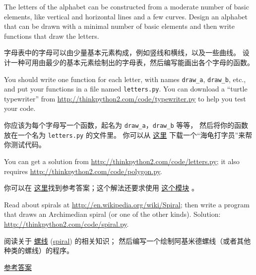\begin{exercise}
    

The letters of the alphabet can be constructed from a moderate number
of basic elements, like vertical and horizontal lines and a few
curves.  Design an alphabet that can be drawn with a minimal
number of basic elements and then write functions that draw the letters.

字母表中的字母可以由少量基本元素构成，例如竖线和横线，以及一些曲线。
设计一种可用由最少的基本元素绘制出的字母表，然后编写能画出各个字母的函数。

You should write one function for each letter, with names
\verb"draw_a", \verb"draw_b", etc., and put your functions
in a file named {\tt letters.py}.  You can download a
``turtle typewriter'' from \url{http://thinkpython2.com/code/typewriter.py}
to help you test your code.

你应该为每个字母写一个函数，起名为 \lstinline{draw_a}，\lstinline{draw_b} 等等，
然后将你的函数放在一个名为 \lstinline{letters.py} 的文件里。
你可以从 \href{http://thinkpython2.com/code/typewriter.py}{这里}
下载一个``海龟打字员''来帮你测试代码。

You can get a solution from \url{http://thinkpython2.com/code/letters.py};
it also requires \url{http://thinkpython2.com/code/polygon.py}.

你可以在 \href{http://thinkpython2.com/code/letters.py}{这里}找到参考答案；这个解法还要求使用 \href{http://thinkpython2.com/code/polygon.py}{这个模块} 。

\end{exercise}

\begin{exercise}

Read about spirals at \url{http://en.wikipedia.org/wiki/Spiral}; then
write a program that draws an Archimedian spiral (or one of the other
kinds).  Solution: \url{http://thinkpython2.com/code/spiral.py}.

阅读关于 \href{https://zh.wikipedia.org/wiki/%E8%9E%BA%E7%BA%BF}{螺线} (\href{http://en.wikipedia.org/wiki/Spiral}{spiral}) 的相关知识；
然后编写一个绘制阿基米德螺线（或者其他种类的螺线）的程序。
  

\href{http://thinkpython2.com/code/spiral.py}{参考答案}

\end{exercise}

